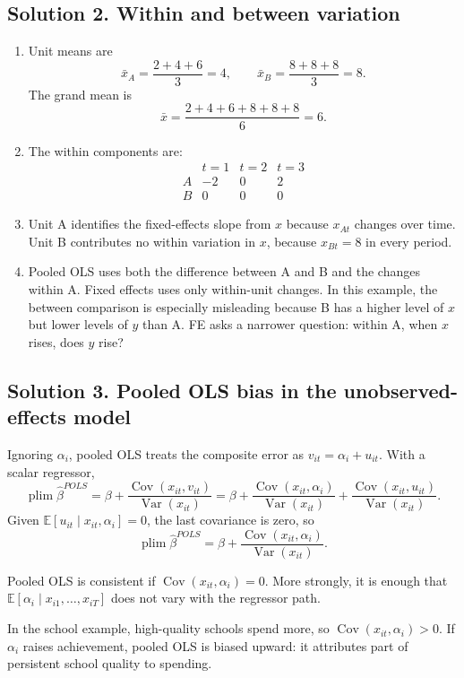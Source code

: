 \documentclass[11pt]{article}
\DeclareMathOperator{\Cov}{Cov}
\DeclareMathOperator{\Var}{Var}
\newcommand{\E}{\mathbb{E}}
\newcommand{\plim}{\operatorname*{plim}}
\begin{document}
\subsection*{Solution 2. Within and between variation}

\begin{solutionbox}
\begin{enumerate}[label=(\alph*)]
\item Unit means are
\[
\bar{x}_A=\frac{2+4+6}{3}=4,\qquad
\bar{x}_B=\frac{8+8+8}{3}=8.
\]
The grand mean is
\[
\bar{x}=\frac{2+4+6+8+8+8}{6}=6.
\]

\item The within components are:
\[
\begin{array}{c|ccc}
&t=1&t=2&t=3\\
\hline
A&-2&0&2\\
B&0&0&0
\end{array}
\]

\item Unit A identifies the fixed-effects slope from $x$ because $x_{At}$ changes over time. Unit B contributes no within variation in $x$, because $x_{Bt}=8$ in every period.

\item Pooled OLS uses both the difference between A and B and the changes within A. Fixed effects uses only within-unit changes. In this example, the between comparison is especially misleading because B has a higher level of $x$ but lower levels of $y$ than A. FE asks a narrower question: within A, when $x$ rises, does $y$ rise?
\end{enumerate}
\end{solutionbox}

\subsection*{Solution 3. Pooled OLS bias in the unobserved-effects model}

\begin{solutionbox}
Ignoring $\alpha_i$, pooled OLS treats the composite error as $v_{it}=\alpha_i+u_{it}$. With a scalar regressor,
\[
\plim \hat{\beta}^{POLS}
=
\beta+\frac{\Cov(x_{it},v_{it})}{\Var(x_{it})}
=
\beta+\frac{\Cov(x_{it},\alpha_i)}{\Var(x_{it})}
+\frac{\Cov(x_{it},u_{it})}{\Var(x_{it})}.
\]
Given $\E[u_{it}\mid x_{it},\alpha_i]=0$, the last covariance is zero, so
\[
\plim \hat{\beta}^{POLS}
=
\beta+\frac{\Cov(x_{it},\alpha_i)}{\Var(x_{it})}.
\]

Pooled OLS is consistent if $\Cov(x_{it},\alpha_i)=0$. More strongly, it is enough that $\E[\alpha_i\mid x_{i1},\ldots,x_{iT}]$ does not vary with the regressor path.

In the school example, high-quality schools spend more, so $\Cov(x_{it},\alpha_i)>0$. If $\alpha_i$ raises achievement, pooled OLS is biased upward: it attributes part of persistent school quality to spending.
\end{solutionbox}
\end{document}

